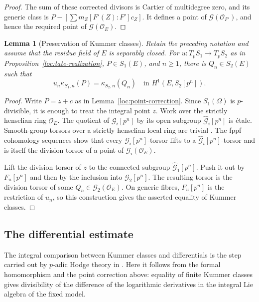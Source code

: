 \documentclass[11pt,a4paper]{article}
\numberwithin{equation}{section}
\theoremstyle{plain}
\newtheorem{lemma}[theorem]{Lemma}
\theoremstyle{definition}
\theoremstyle{remark}
\newcommand{\etale}{\'etale}
\renewcommand{\S}{\ensuremath{\mathsection}}
\begin{document}
\begin{proof}
The sum of these corrected divisors is Cartier of multidegree zero,
and its generic class is
$P-[\sum m_Z[F'(Z):F']c_Z]$.  It defines a point of
$\mathcal G(\mathcal O_{F'})$, and hence the required point of
$\mathcal G(\mathcal O_E)$.
\end{proof}

\begin{lemma}[Preservation of Kummer classes]
\label{loc:kummer-transfer}
Retain the preceding notation and assume that the residue field of $E$
is separably closed.  For $u:T_pS_1\to T_pS_2$ as in
Proposition~\ref{loc:tate-realization}, $P\in S_1(E)$, and $n\ge1$, there
is $Q_n\in S_2(E)$ such that
\[
 u_n\kappa_{S_1,n}(P)=\kappa_{S_2,n}(Q_n)
       \quad\text{in }H^1(E,S_2[p^n]).
\]
\end{lemma}
\begin{proof}
Write $P=z+c$ as in Lemma~\ref{loc:point-correction}.  Since
$S_1(\Omega)$ is $p$-divisible, it is enough to treat the integral point
$z$.  Work over the strictly henselian ring $\mathcal O_E$.
The quotient of $\mathcal G_i[p^n]$ by its open subgroup
$\widehat{\mathcal G}_i[p^n]$ is \etale.
Smooth-group torsors over a strictly henselian local ring are trivial
\cite[Expos\'e~XXIV, Proposition~8.1 and its footnote]{SGA3}.  The fppf
cohomology sequences show that every $\mathcal G_i[p^n]$-torsor lifts
to a $\widehat{\mathcal G}_i[p^n]$-torsor and is itself the division
torsor of a point of $\mathcal G_i(\mathcal O_E)$.

Lift the division torsor of $z$ to the connected subgroup
$\widehat{\mathcal G}_1[p^n]$.  Push it out by $F_u[p^n]$ and then by
the inclusion into $\mathcal G_2[p^n]$.  The resulting torsor is the
division torsor of some $Q_n\in\mathcal G_2(\mathcal O_E)$.
On generic fibres, $F_u[p^n]$ is the restriction of $u_n$, so this
construction gives the asserted equality of Kummer classes.
\end{proof}

\subsection{The differential estimate}

The integral comparison between Kummer classes and differentials is the
step carried out by $p$-adic Hodge theory in
\cite[\S9, before Lemma~9.2]{Mochizuki1999}.  Here it follows from the
formal homomorphism and the point correction above: equality of finite
Kummer classes gives divisibility of the difference of the logarithmic
derivatives in the integral Lie algebra of the fixed model.
\end{document}
